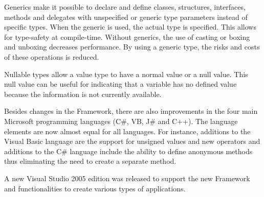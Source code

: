 Generics make it possible to declare and define classes, structures, interfaces, methods and delegates with unspecified or generic type parameters instead of specific types.
When the generic is used, the actual type is specified.
This allows for type-safety at compile-time.
Without generics, the use of casting or boxing and unboxing decreases performance.
By using a generic type, the risks and costs of these operations is reduced.

Nullable types allow a value type to have a normal value or a null value.
This null value can be useful for indicating that a variable has no defined value because the information is not currently available.

Besides changes in the Framework, there are also improvements in the four main Microsoft \dotNET programming languages (C\#, VB\dotNET, J\# and C++).
The language elements are now almost equal for all languages.
For instance, additions to the Visual Basic language are the support for unsigned values and new operators and additions to the C\# language include the ability to define anonymous methods thus eliminating the need to create a separate method.

A new Visual Studio 2005 edition was released to support the new Framework and functionalities to create various types of applications.
